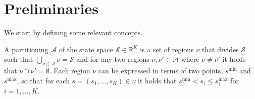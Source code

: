 \section{Preliminaries}%
\label{sec:preliminaries}

We start by defining some relevant concepts.




\begin{definition}[Partitions]%
    A partitioning $\mathcal{A}$ of the state space $\mathcal{S} \in
    \mathbb{R}^K$ is a set of regions $\nu$ that divides $\mathcal{S}$ such that
    $\bigcup_{\nu \in \mathcal{A}}\nu = \mathcal{S}$ and for any two regions
    $\nu, \nu' \in \mathcal{A}$ where $\nu \neq \nu'$ it holds that $\nu \cap
    \nu' = \emptyset$. Each region $\nu$ can be expressed in terms of two
    points, $s^{\min}$ and $s^{\max}$, so that for each $s = (s_1, \ldots, s_K)
    \in \nu$ it holds that $s^{\min}_i < s_i \le  s^{\max}_i$ for $i =
    1,\ldots,K$.
\end{definition}

